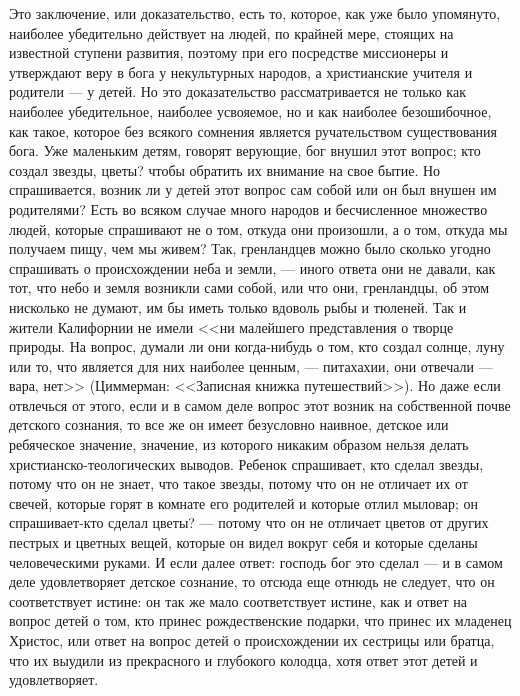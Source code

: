 \documentclass[12pt]{article}
\begin{document}
Это заключение, или доказательство, есть то, которое, как уже было упомянуто, наиболее убедительно действует на людей, по крайней мере, стоящих на известной ступени развития, поэтому при его посредстве миссионеры и утверждают веру в бога у некультурных народов, а христианские учителя и родители --- у детей. Но это доказательство рассматривается не только как наиболее убедительное, наиболее усвояемое, но и как наиболее безошибочное, как такое, которое без всякого сомнения является ручательством существования бога. Уже маленьким детям, говорят верующие, бог внушил этот вопрос; кто создал звезды, цветы? чтобы обратить их внимание на свое бытие. Но спрашивается, возник ли у детей этот вопрос сам собой или он был внушен им родителями? Есть во всяком случае много народов и бесчисленное множество людей, которые спрашивают не о том, откуда они произошли, а о том, откуда мы получаем пищу, чем мы живем? Так, гренландцев можно было сколько угодно спрашивать о происхождении неба и земли, --- иного ответа они не давали, как тот, что небо и земля возникли сами собой, или что они, гренландцы, об этом нисколько не думают, им бы иметь только вдоволь рыбы и тюленей. Так и жители Калифорнии не имели <<ни малейшего представления о творце природы. На вопрос, думали ли они когда-нибудь о том, кто создал солнце, луну или то, что является для них наиболее ценным, --- питахахии, они отвечали --- вара, нет>> (Циммерман: <<Записная книжка путешествий>>). Но даже если отвлечься от этого, если и в самом деле вопрос этот возник на собственной почве детского сознания, то все же он имеет безусловно наивное, детское или ребяческое значение, значение, из которого никаким образом нельзя делать христианско-теологических выводов. Ребенок спрашивает, кто сделал звезды, потому что он не знает, что такое звезды, потому что он не отличает их от свечей, которые горят в комнате его родителей и которые отлил мыловар; он спрашивает-кто сделал цветы? --- потому что он не отличает цветов от других пестрых и цветных вещей, которые он видел вокруг себя и которые сделаны человеческими руками. И если далее ответ: господь бог это сделал --- и в самом деле удовлетворяет детское сознание, то отсюда еще отнюдь не следует, что он соответствует истине: он так же мало соответствует истине, как и ответ на вопрос детей о том, кто принес рождественские подарки, что принес их младенец Христос, или ответ на вопрос детей о происхождении их сестрицы или братца, что их выудили из прекрасного и глубокого колодца, хотя ответ этот детей и удовлетворяет. 
\end{document}
